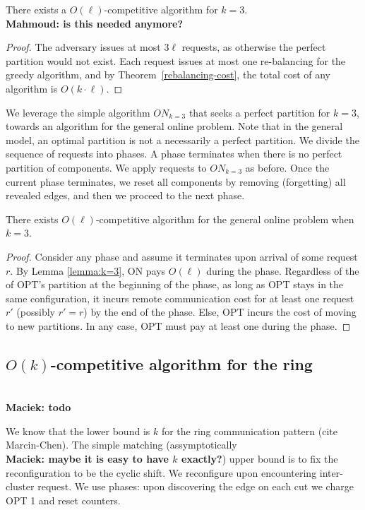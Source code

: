 \documentclass[manuscript,screen=true]{acmart}
\newcommand\mahmoud[1]{\color{green}\textbf{\\ Mahmoud: #1}\\\color{black}}
\newcommand\maciek[1]{\color{brown}\textbf{\\ Maciek: #1}\color{black}}
\begin{document}
\begin{appendix}
    \begin{theorem}
      There exists a $O(\ell)$-competitive algorithm for $k=3$.
    \mahmoud{is this needed anymore?}
    \end{theorem}
    
    \begin{proof}
      The adversary issues at most $3\ell$ requests, as otherwise the perfect partition would not exist. Each request issues at most one re-balancing for the greedy algorithm, and by Theorem~\ref{rebalancing-cost}, the total cost of any algorithm is $O(k\cdot \ell)$.
    \end{proof}
    
    We leverage the simple algorithm $ON_{k=3}$ that seeks a perfect partition for $k=3$,
    towards an algorithm for the general online problem.
    Note that in the general model,
    an optimal partition is not a necessarily a perfect partition.
    We divide the sequence of requests into phases.
    A phase terminates when there is no perfect partition of components.
    We apply requests to $ON_{k=3}$ as before. 
    Once the current phase terminates,
    we reset all components by removing (forgetting) all revealed edges,
     and then we proceed to the next phase.
    
    \begin{corollary} \label{cor:k=3}
        There exists $O(\ell)$-competitive  algorithm for the general online problem when $k=3$. 
    \end{corollary}
    \begin{proof}
        Consider any phase and assume it terminates upon arrival of some request $r$.
         By Lemma  \ref{lemma:k=3},
        ON pays $O(\ell)$ during the phase.
        Regardless of the of OPT's partition at the beginning of the phase,
        as long as OPT stays in the same configuration,
         it incurs remote communication cost for at least one request $r'$ (possibly $r'=r$) by the end of the phase.
         Else,
         OPT incurs the cost of moving to new partitions.
         In any case,
         OPT must pay at least one during the phase.
    \end{proof}
        
          \subsection{$O(k)$-competitive algorithm for the ring}
    
          \maciek{todo}
    
          We know that the lower bound is $k$ for the ring communication pattern (cite Marcin-Chen).
          The simple matching (assymptotically \maciek{maybe it is easy to have $k$ exactly?}) upper bound is to fix the reconfiguration to be the cyclic shift. We reconfigure upon encountering inter-cluster request. We use phases: upon discovering the edge on each cut we charge OPT 1 and reset counters.

\end{appendix}
\end{document}
